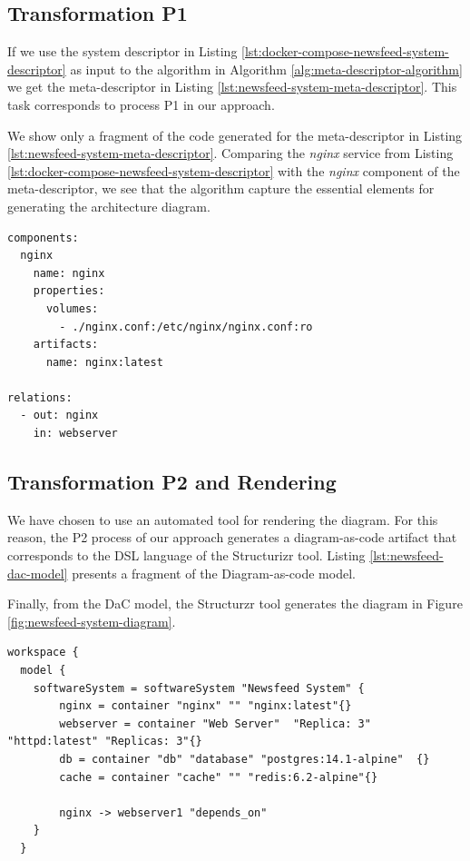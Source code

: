 \documentclass[sigconf]{acmart}
\begin{document}
\subsection{Transformation P1}
If we use the system descriptor in Listing \ref{lst:docker-compose-newsfeed-system-descriptor} as input to the algorithm in Algorithm \ref{alg:meta-descriptor-algorithm} we get the meta-descriptor in Listing \ref{lst:newsfeed-system-meta-descriptor}. This task corresponds to process P1 in our approach.

We show only a fragment of the code generated for the meta-descriptor in Listing \ref{lst:newsfeed-system-meta-descriptor}. Comparing the \textit{nginx} service from Listing \ref{lst:docker-compose-newsfeed-system-descriptor} with the \textit{nginx} component of the meta-descriptor, we see that the algorithm capture the essential elements for generating the architecture diagram.

\begin{lstlisting}[caption={Newsfeed System meta-descriptor}, label={lst:newsfeed-system-meta-descriptor}]
components:
  nginx
    name: nginx
    properties:
      volumes:
        - ./nginx.conf:/etc/nginx/nginx.conf:ro
    artifacts:
      name: nginx:latest

relations: 
  - out: nginx
    in: webserver
\end{lstlisting}

\subsection{Transformation P2 and Rendering}
We have chosen to use an automated tool for rendering the diagram. For this reason, the P2 process of our approach generates a diagram-as-code artifact that corresponds to the DSL language of the Structurizr tool. Listing \ref{lst:newsfeed-dac-model} presents a fragment of the Diagram-as-code model.

Finally, from the DaC model, the Structurzr tool generates the diagram in Figure \ref{fig:newsfeed-system-diagram}.

\begin{lstlisting}[caption={Newsfeed System Diagram-as-code model}, label={lst:newsfeed-dac-model}]
workspace {
  model {
    softwareSystem = softwareSystem "Newsfeed System" {
        nginx = container "nginx" "" "nginx:latest"{}
        webserver = container "Web Server"  "Replica: 3" "httpd:latest" "Replicas: 3"{}
        db = container "db" "database" "postgres:14.1-alpine"  {}
        cache = container "cache" "" "redis:6.2-alpine"{}
            
        nginx -> webserver1 "depends_on"
    }
  }
\end{lstlisting}
\end{document}
